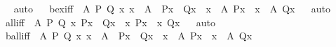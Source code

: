 \begin{isabellebody}
\isadelimproof
\ %
\endisadelimproof
%
\isatagproof
{}\isamarkupfalse%
\ auto%
\endisatagproof
{\isafoldproof}%
%
\isadelimproof
%
\endisadelimproof
\ \isanewline
{}\isamarkupfalse%
\ bex{\isacharunderscore}{\kern0pt}iff\ {\isacharcolon}{\kern0pt}\ {\isachardoublequoteopen}{\isasymAnd}A\ P\ Q{\isachardot}{\kern0pt}\ {\isacharparenleft}{\kern0pt}{\isasymAnd}x{\isachardot}{\kern0pt}\ x\ {\isasymin}\ A\ {\isasymLongrightarrow}\ P{\isacharparenleft}{\kern0pt}x{\isacharparenright}{\kern0pt}\ {\isasymlongleftrightarrow}\ Q{\isacharparenleft}{\kern0pt}x{\isacharparenright}{\kern0pt}{\isacharparenright}{\kern0pt}\ {\isasymLongrightarrow}\ {\isacharparenleft}{\kern0pt}{\isasymexists}x\ {\isasymin}\ A{\isachardot}{\kern0pt}\ P{\isacharparenleft}{\kern0pt}x{\isacharparenright}{\kern0pt}{\isacharparenright}{\kern0pt}\ {\isasymlongleftrightarrow}\ {\isacharparenleft}{\kern0pt}{\isasymexists}x\ {\isasymin}\ A{\isachardot}{\kern0pt}\ Q{\isacharparenleft}{\kern0pt}x{\isacharparenright}{\kern0pt}{\isacharparenright}{\kern0pt}{\isachardoublequoteclose}%
\isadelimproof
\ %
\endisadelimproof
%
\isatagproof
{}\isamarkupfalse%
\ auto%
\endisatagproof
{\isafoldproof}%
%
\isadelimproof
%
\endisadelimproof
\ \isanewline
{}\isamarkupfalse%
\ all{\isacharunderscore}{\kern0pt}iff\ {\isacharcolon}{\kern0pt}\ {\isachardoublequoteopen}{\isasymAnd}A\ P\ Q{\isachardot}{\kern0pt}\ {\isacharparenleft}{\kern0pt}{\isasymAnd}x{\isachardot}{\kern0pt}\ P{\isacharparenleft}{\kern0pt}x{\isacharparenright}{\kern0pt}\ {\isasymlongleftrightarrow}\ Q{\isacharparenleft}{\kern0pt}x{\isacharparenright}{\kern0pt}{\isacharparenright}{\kern0pt}\ {\isasymLongrightarrow}\ {\isacharparenleft}{\kern0pt}{\isasymforall}x{\isachardot}{\kern0pt}\ P{\isacharparenleft}{\kern0pt}x{\isacharparenright}{\kern0pt}{\isacharparenright}{\kern0pt}\ {\isasymlongleftrightarrow}\ {\isacharparenleft}{\kern0pt}{\isasymforall}x{\isachardot}{\kern0pt}\ Q{\isacharparenleft}{\kern0pt}x{\isacharparenright}{\kern0pt}{\isacharparenright}{\kern0pt}{\isachardoublequoteclose}%
\isadelimproof
\ %
\endisadelimproof
%
\isatagproof
{}\isamarkupfalse%
\ auto%
\endisatagproof
{\isafoldproof}%
%
\isadelimproof
%
\endisadelimproof
\ \isanewline
{}\isamarkupfalse%
\ ball{\isacharunderscore}{\kern0pt}iff\ {\isacharcolon}{\kern0pt}\ {\isachardoublequoteopen}{\isasymAnd}A\ P\ Q{\isachardot}{\kern0pt}\ {\isacharparenleft}{\kern0pt}{\isasymAnd}x{\isachardot}{\kern0pt}\ x\ {\isasymin}\ A\ {\isasymLongrightarrow}\ P{\isacharparenleft}{\kern0pt}x{\isacharparenright}{\kern0pt}\ {\isasymlongleftrightarrow}\ Q{\isacharparenleft}{\kern0pt}x{\isacharparenright}{\kern0pt}{\isacharparenright}{\kern0pt}\ {\isasymLongrightarrow}\ {\isacharparenleft}{\kern0pt}{\isasymforall}x\ {\isasymin}\ A{\isachardot}{\kern0pt}\ P{\isacharparenleft}{\kern0pt}x{\isacharparenright}{\kern0pt}{\isacharparenright}{\kern0pt}\ {\isasymlongleftrightarrow}\ {\isacharparenleft}{\kern0pt}{\isasymforall}x\ {\isasymin}\ A{\isachardot}{\kern0pt}\ Q{\isacharparenleft}{\kern0pt}x{\isacharparenright}{\kern0pt}{\isacharparenright}{\kern0pt}{\isachardoublequoteclose}%

\end{isabellebody}

